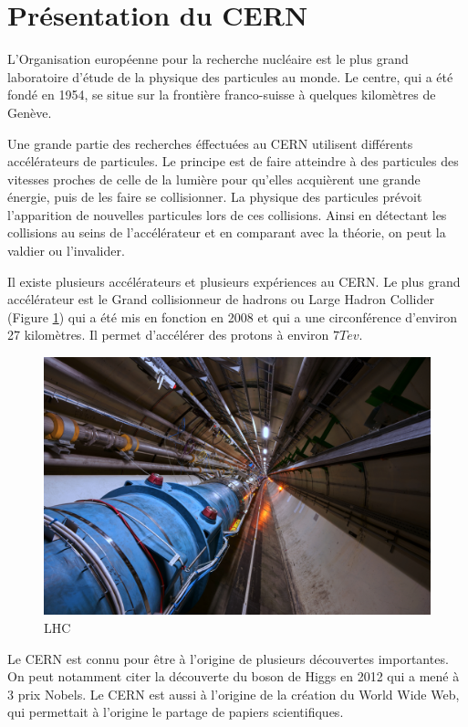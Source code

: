 \documentclass[a4paper]{report}
\begin{document}
\section{Présentation du CERN}
L'Organisation européenne pour la recherche nucléaire est le plus grand laboratoire d'étude de la physique des particules au monde.
Le centre, qui a été fondé en 1954, se situe sur la frontière franco-suisse à quelques kilomètres de Genève.

Une grande partie des recherches éffectuées au CERN utilisent différents accélérateurs de particules.
Le principe est de faire atteindre à des particules des vitesses proches de celle de la lumière pour qu'elles acquièrent une grande énergie, puis de les faire se collisionner.
La physique des particules prévoit l'apparition de nouvelles particules lors de ces collisions.
Ainsi en détectant les collisions au seins de l'accélérateur et en comparant avec la théorie, on peut la valdier ou l'invalider.

Il existe plusieurs accélérateurs et plusieurs expériences au CERN.
Le plus grand accélérateur est le Grand collisionneur de hadrons ou Large Hadron Collider (Figure \ref{LHC}) qui a été mis en fonction en 2008 et qui a une circonférence d'environ 27 kilomètres.
Il permet d'accélérer des protons à environ $7 Tev$.

\begin{figure}[!htb]
    \includegraphics[width=\textwidth, center]{LHC.jpg}
    \caption{LHC}
    \label{LHC}
\end{figure}

Le CERN est connu pour être à l'origine de plusieurs découvertes importantes.
On peut notamment citer la découverte du boson de Higgs en 2012 qui a mené à 3 prix Nobels.
Le CERN est aussi à l'origine de la création du World Wide Web, qui permettait à l'origine le partage de papiers scientifiques.
\end{document}
